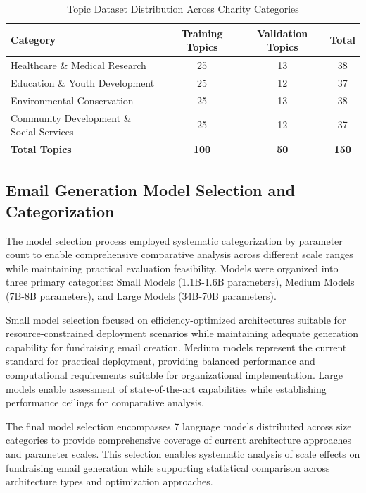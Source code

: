 \begin{table}[H]
    \centering
    \caption{Topic Dataset Distribution Across Charity Categories}
    \label{tab:topic-distribution}
    \begin{tabular}{|l|c|c|c|}
    \hline
    \textbf{Category} & \textbf{Training Topics} & \textbf{Validation Topics} & \textbf{Total} \\
    \hline
    Healthcare \& Medical Research & 25 & 13 & 38 \\
    Education \& Youth Development & 25 & 12 & 37 \\
    Environmental Conservation & 25 & 13 & 38 \\
    Community Development \& Social Services & 25 & 12 & 37 \\
    \hline
    \textbf{Total Topics} & \textbf{100} & \textbf{50} & \textbf{150} \\
    \hline
    \end{tabular}
\end{table}

\subsection{Email Generation Model Selection and Categorization}

The model selection process employed systematic categorization by parameter count to enable comprehensive comparative analysis across different scale ranges while maintaining practical evaluation feasibility. Models were organized into three primary categories: Small Models (1.1B-1.6B parameters), Medium Models (7B-8B parameters), and Large Models (34B-70B parameters).

Small model selection focused on efficiency-optimized architectures suitable for resource-constrained deployment scenarios while maintaining adequate generation capability for fundraising email creation. Medium models represent the current standard for practical deployment, providing balanced performance and computational requirements suitable for organizational implementation. Large models enable assessment of state-of-the-art capabilities while establishing performance ceilings for comparative analysis.

The final model selection encompasses 7 language models distributed across size categories to provide comprehensive coverage of current architecture approaches and parameter scales. This selection enables systematic analysis of scale effects on fundraising email generation while supporting statistical comparison across architecture types and optimization approaches.

